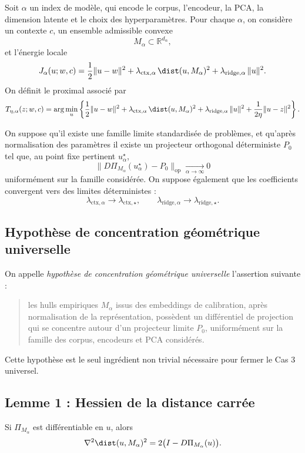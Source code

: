 Soit \(\alpha\) un index de modèle, qui encode le corpus, l'encodeur, la PCA, la dimension latente et le choix des hyperparamètres. Pour chaque \(\alpha\), on considère un contexte \(c\), un ensemble admissible convexe
\[
M_\alpha \subset \mathbb R^{d_\alpha},
\]
et l'énergie locale
\[
J_\alpha(u;w,c)
=
\frac12\|u-w\|^2
+
\lambda_{\mathrm{ctx},\alpha}\,\dist(u,M_\alpha)^2
+
\lambda_{\mathrm{ridge},\alpha}\,\|u\|^2.
\]
On définit le proximal associé par
\[
T_{\eta,\alpha}(z;w,c)
=
\arg\min_u
\left\{
\frac12\|u-w\|^2
+
\lambda_{\mathrm{ctx},\alpha}\,\dist(u,M_\alpha)^2
+
\lambda_{\mathrm{ridge},\alpha}\,\|u\|^2
+
\frac{1}{2\eta}\|u-z\|^2
\right\}.
\]

On suppose qu'il existe une famille limite standardisée de problèmes, et qu'après normalisation des paramètres il existe un projecteur orthogonal déterministe \(P_0\) tel que, au point fixe pertinent \(u_\alpha^\star\),
\[
\|D\Pi_{M_\alpha}(u_\alpha^\star)-P_0\|_{\mathrm{op}}\xrightarrow[\alpha\to\infty]{}0
\]
uniformément sur la famille considérée.  
On suppose également que les coefficients convergent vers des limites déterministes :
\[
\lambda_{\mathrm{ctx},\alpha}\to \lambda_{\mathrm{ctx},\star},
\qquad
\lambda_{\mathrm{ridge},\alpha}\to \lambda_{\mathrm{ridge},\star}.
\]

\subsection{Hypothèse de concentration géométrique universelle}

On appelle \emph{hypothèse de concentration géométrique universelle} l'assertion suivante :

\begin{quote}
les hulls empiriques \(M_\alpha\) issus des embeddings de calibration, après normalisation de la représentation, possèdent un différentiel de projection qui se concentre autour d'un projecteur limite \(P_0\), uniformément sur la famille des corpus, encodeurs et PCA considérés.
\end{quote}

Cette hypothèse est le seul ingrédient non trivial nécessaire pour fermer le Cas 3 universel.

\subsection{Lemme 1 : Hessien de la distance carrée}

\begin{lemma}
Si \(\Pi_{M_\alpha}\) est différentiable en \(u\), alors
\[
\nabla^2 \dist(u,M_\alpha)^2
=
2\bigl(I-D\Pi_{M_\alpha}(u)\bigr).
\]
\end{lemma}

